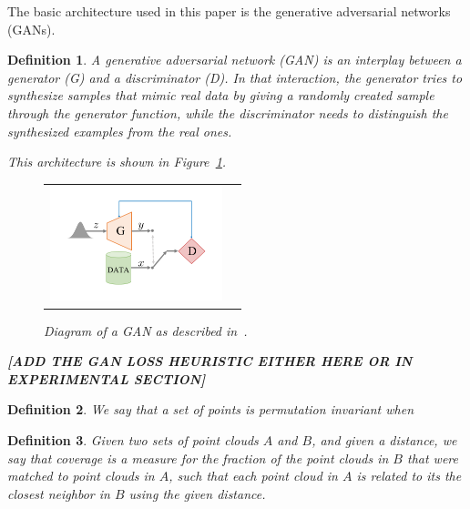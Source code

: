 \documentclass[12pt]{article}
\newtheorem{definition}{Definition}
\begin{document}
    The basic architecture used in this paper is the generative adversarial networks (GANs).

    \begin{definition}
        \normalfont
        A \emph{generative adversarial network} (GAN) is an interplay between a \emph{generator} (G) and a \emph{discriminator} (D).
        In that interaction, the generator tries to synthesize samples that mimic real data by giving a randomly created sample through the generator function, while the discriminator needs to distinguish the synthesized examples from the real ones.

        This architecture is shown in Figure~\ref{figure:diagram_of_gan}.

        \begin{figure}[H]
            \centering
            \begin{tabular}{cc}
                \includegraphics[width = 50mm]{gan}
            \end{tabular}
            \caption{Diagram of a GAN as described in~\cite{pmlr-v80-achlioptas18a}.}
            \label{figure:diagram_of_gan}
        \end{figure}

        \textbf{[ADD THE GAN LOSS HEURISTIC EITHER HERE OR IN EXPERIMENTAL SECTION]}

    \end{definition}

    \begin{definition}
        \normalfont
        We say that a set of points is \emph{permutation invariant} when
    \end{definition}

    \begin{definition}
        \normalfont
        Given two sets of point clouds $A$ and $B$, and given a distance, we say that \emph{coverage} is a measure for the fraction of the point clouds in $B$ that were matched to point clouds in $A$, such that each point cloud in $A$ is related to its the closest neighbor in $B$ using the given distance.
    \end{definition}
\end{document}

